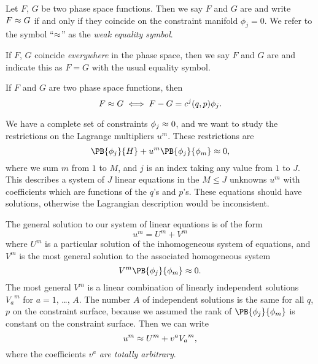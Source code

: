 \begin{definition}
Let $F$, $G$ be two phase space functions. Then we say $F$ and $G$ are
 and write $F\approx G$ if and only if they
coincide on the constraint manifold $\phi_{j}=0$. We refer to the symbol
``$\approx$'' as the \emph{weak equality symbol}.

If $F$, $G$ coincide \emph{everywhere} in the phase space, then we say
$F$ and $G$ are  and indicate this as $F = G$
with the usual equality symbol.
\end{definition}

\begin{theorem}
If $F$ and $G$ are two phase space functions, then
\begin{equation}
F\approx G\iff F-G = c^{j}(q,p)\phi_{j}.
\end{equation}
\end{theorem}

We have a complete set of constraints $\phi_{j}\approx0$, and we want to
study the restrictions on the Lagrange multipliers $u^{m}$. These
restrictions are
\begin{equation}
\PB{\phi_{j}}{H} + u^{m}\PB{\phi_{j}}{\phi_{m}}\weakEq0,
\end{equation}
where we sum $m$ from $1$ to $M$, and $j$ is an index taking any value
from $1$ to $J$. This describes a system of $J$ linear equations in the
$M\leq J$ unknowns $u^{m}$ with coefficients which are functions of the
$q$'s and $p$'s. These equations should have solutions, otherwise the
Lagrangian description would be inconsistent.

The general solution to our system of linear equations is of the form
\begin{equation}
u^{m} = U^{m} + V^{m}
\end{equation}
where $U^{m}$ is a particular solution of the inhomogeneous system of
equations, and $V^{m}$ is the most general solution to the associated
homogeneous system
\begin{equation}
V^{m}\PB{\phi_{j}}{\phi_{m}}\weakEq0.
\end{equation}
The most general $V^{m}$ is a linear combination of linearly independent
solutions ${V_{a}}^{m}$ for $a=1$, \dots, $A$. The number $A$ of
independent solutions is the same for all $q$, $p$ on the constraint
surface, because we assumed the rank of $\PB{\phi_{j}}{\phi_{m}}$ is
constant on the constraint surface.
Then we can write
\begin{equation}
u^{m}\approx U^{m} + v^{a}{V_{a}}^{m},
\end{equation}
where the coefficients $v^{a}$ \emph{are totally arbitrary}.

